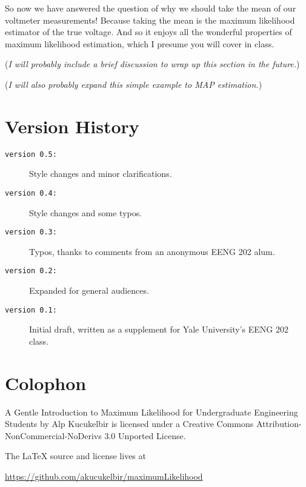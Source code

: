\documentclass[10pt]{article}
\begin{document}
So now we have answered the question of why we should take the mean of our voltmeter measurements! Because taking the mean is the maximum likelihood estimator of the true voltage. And so it enjoys all the wonderful properties of maximum likelihood estimation, which I presume you will cover in class.

(\emph{I will probably include a brief discussion to wrap up this section in the future.})

(\emph{I will also probably expand this simple example to MAP estimation.})

\section{Version History}
\begin{description}
	\item[\texttt{version 0.5:}] Style changes and minor clarifications.
	\item[\texttt{version 0.4:}] Style changes and some typos.
	\item[\texttt{version 0.3:}] Typos, thanks to comments from an anonymous EENG 202 alum.
	\item[\texttt{version 0.2:}] Expanded for general audiences.
	\item[\texttt{version 0.1:}] Initial draft, written as a supplement for Yale University's EENG 202 class.
\end{description}

\section{Colophon}
A Gentle Introduction to Maximum Likelihood for Undergraduate Engineering Students by Alp Kucukelbir is licensed under a Creative Commons Attribution-NonCommercial-NoDerivs 3.0 Unported License.

The \LaTeX{} source and license lives at
\begin{center}
	\url{https://github.com/akucukelbir/maximumLikelihood}
\end{center}
\end{document}
